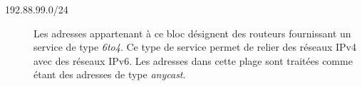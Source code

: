 \begin{description}
\item[192.88.99.0/24]
Les adresses appartenant à ce bloc désignent des routeurs 
fournissant un service de type {\it 6to4}. Ce type de service
permet de relier des réseaux IPv4 avec des réseaux IPv6.
Les adresses dans cette plage sont traitées comme étant des adresses
de type {\it anycast}.


\end{description}


